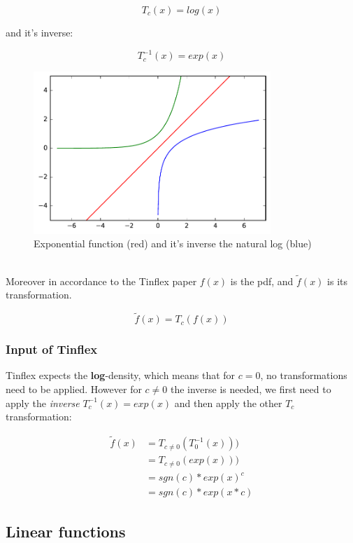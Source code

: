 \documentclass[]{article}
\begin{document}
\[T_c(x) = log(x)  \]

and it's inverse:

\[T_c^{-1}(x) = exp(x) \]

\begin{figure}[h]
\centering
\includegraphics[width=0.8\textwidth]{figs/log_exp}
\caption{Exponential function (red) and it's inverse the natural log (blue)}
\label{fig:log_exp}
\end{figure}

\ \\

Moreover in accordance to the Tinflex paper $f(x)$ is the pdf, and $\tilde{f}(x)$ is its transformation.

\[\tilde{f}(x) = T_c(f(x))  \]

\subsubsection{Input of Tinflex}

Tinflex expects the \textbf{log}-density, which means that for $c = 0$, no transformations need to be applied.
However for $c \neq 0$ the inverse is needed, we first need to apply the \textit{inverse} $T_c^{-1}(x) = exp(x)$ and then apply the other $T_c$ transformation:

\begin{align*}
\tilde{f}(x) &= T_{c \neq 0}(T_0^{-1}(x))) \\
&= T_{c \neq 0}(exp(x))) \\
&= sgn(c) * exp(x)^c \\
&= sgn(c) * exp(x *c)
\end{align*}

\subsection{Linear functions}
\end{document}

